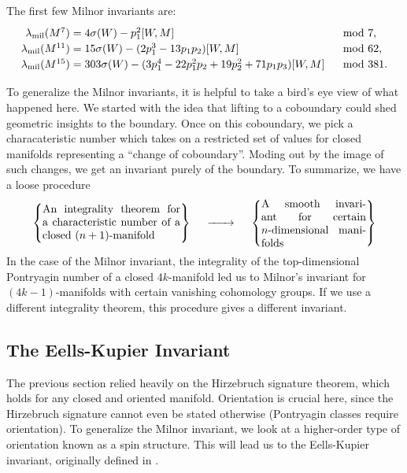 \begin{example}
	The first few Milnor invariants are:
	\[
		\renewcommand{\arraystretch}{1.2}
		\begin{array}{r@{\;}ll}
			\milinv(M^7)
			 & = 4\sigma(W) - p_1^2[W, M]
			 & \mod 7,                                                        \\
			\milinv(M^{11})
			 & = 15\sigma(W) - (2p_1^3-13p_1p_2)[W,M]
			 & \mod 62,                                                       \\
			\milinv(M^{15})
			 & = 303\sigma(W) - (3p_1^4-22p_1^2p_2 + 19p_2^2 + 71p_1p_3)[W,M]
			 & \mod 381.
		\end{array}
	\]
\end{example}

To generalize the Milnor invariants, it is helpful to take a bird's eye view of what happened here. We started with the idea that lifting to a coboundary could shed geometric insights to the boundary. Once on this coboundary, we pick a characateristic number which takes on a restricted set of values for closed manifolds representing a ``change of coboundary''. Moding out by the image of such changes, we get an invariant purely of the boundary. To summarize, we have a loose procedure
\[
	\left\{\parbox{12.5em}{An integrality theorem for a characteristic number of a closed $(n+1)$-manifold}\right\}
	\quad\lkxto\quad
	\left\{\parbox{9.5em}{A smooth invariant for certain $n$-dimensional manifolds}\right\}
\]
In the case of the Milnor invariant, the integrality of the top-dimensional Pontryagin number of a closed $4k$-manifold led us to Milnor's invariant for $(4k-1)$-manifolds with certain vanishing cohomology groups.
If we use a different integrality theorem, this procedure gives a different invariant.

\subsection{The Eells-Kupier Invariant}\label{sec:eells-kupier-invariant}


The previous section relied heavily on the Hirzebruch signature theorem, which holds for any closed and oriented manifold.
Orientation is crucial here, since the Hirzebruch signature cannot even be stated otherwise (Pontryagin classes require orientation). To generalize the Milnor invariant, we look at a higher-order type of orientation known as a spin structure. This will lead us to the Eells-Kupier invariant, originally defined in \cite{eellskupier1962}.

